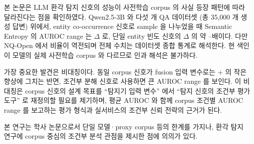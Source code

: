\documentclass[oneside,ko,under]{snuthesis}
\begin{document}
본 논문은 LLM 환각 탐지 신호의 성능이 사전학습 corpus 의 사실 등장 패턴에 따라 달라진다는 점을 확인하였다. Qwen2.5-3B 와 다섯 개 QA 데이터셋 (총 35{,}000 개 생성 답변) 위에서, entity co-occurrence 신호로 sample 을 나누었을 때 Semantic Entropy 의 AUROC range 는 $\Delta$\HeadlineEntityPairSEDelta{} 로, 단일 entity 빈도 신호의 $\Delta$\HeadlineEntityFreqSEDelta{} 의 약 \HeadlineRatioRangeLow{}--\HeadlineRatioRangeHigh{}배이다. 다만 NQ-Open 에서 비율이 역전되며 전체 수치는 데이터셋 종합 통계로 해석한다. 현 색인이 모델의 실제 사전학습 corpus 와 다르므로 인과 해석은 불가하다.

가장 중요한 발견은 비대칭이다. 동일 corpus 신호가 fusion 입력 변수로는 +\HeadlineCorpusLiftGBM{} 의 작은 향상에 그치는 반면, 조건부 분해 신호로 사용하면 큰 AUROC range 를 보인다. 이 비대칭은 corpus 신호의 설계 목표를 ``탐지기 입력 변수'' 에서 ``탐지 신호의 조건부 평가 도구'' 로 재정의할 필요를 제기하며, 평균 AUROC 와 함께 corpus 조건별 AUROC range 를 보고하는 평가 형식과 실서비스의 조건부 신뢰 전략의 근거가 된다.

본 연구는 학사 논문으로서 단일 모델·proxy corpus 등의 한계를 가지나, 환각 탐지 연구에 corpus 중심의 조건부 분석 관점을 제시한 점에 의의가 있다.
\end{document}
